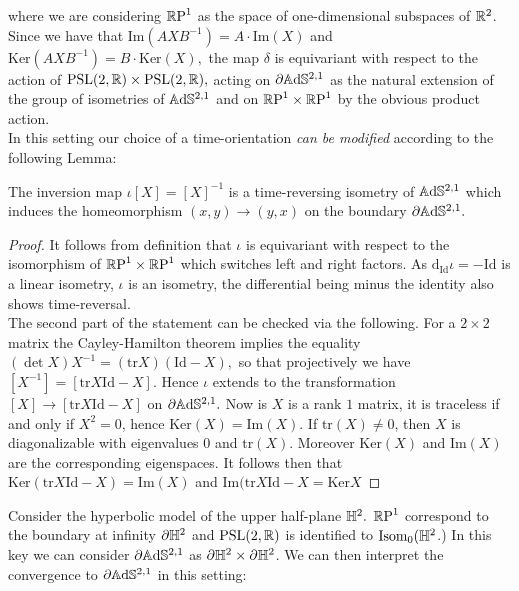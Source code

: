 where we are considering $\mathbb{R}\text{P}^1$ as the space of one-dimensional subspaces of $\mathbb{R}^2$. Since we have that $\text{Im}(AXB^{-1})=A\cdot\text{Im}(X)$ and $\text{Ker} (AXB^{-1})=B\cdot\text{Ker}(X),$ the map $\delta$ is equivariant with respect to the action of $\text{PSL}(2,\mathbb{R})\times\text{PSL}(2,\mathbb{R}),$ acting on $\partial\mathbb{A}\mathrm{d}\mathbb{S}^{2,1}$ as the natural extension of the group of isometries of $\mathbb{A}\mathrm{d}\mathbb{S}^{2,1}$ and on $\mathbb{R}\text{P}^1\times\mathbb{R}\text{P}^1$ by the obvious product action.\\
In this setting our choice of a time-orientation \textit{can be modified} according to the following Lemma:
\begin{lemma}\label{invertime}
    The inversion map $\iota[X]=[X]^{-1}$  is a time-reversing isometry of $\mathbb{A}\mathrm{d}\mathbb{S}^{2,1}$ which induces the homeomorphism $(x,y)\to(y,x)$ on the boundary $\partial\mathbb{A}\mathrm{d}\mathbb{S}^{2,1}.$
\end{lemma}
\begin{proof}
    It follows from definition that $\iota$ is equivariant with respect to the isomorphism of $\mathbb{R}\text{P}^1\times\mathbb{R}\text{P}^1$ which switches left and right factors. As $\text{d}_\text{Id}\iota=-\text{Id}$ is a linear isometry, $\iota$ is an isometry, the differential being minus the identity also shows time-reversal. \\
    The second part of the statement can be checked via the following. For a $2\times2$ matrix the Cayley-Hamilton theorem implies the equality $(\det X)X^{-1}=(\text{tr}X)(\text{Id}-X),$ so that projectively we have $[X^{-1}]=[\text{tr}X\text{Id}-X].$ Hence $\iota$ extends to the transformation $[X]\to[\text{tr}X\text{Id}-X]$ on $\partial\mathbb{A}\mathrm{d}\mathbb{S}^{2,1}.$ Now is $X$ is a rank $1$ matrix, it is traceless if and only if $X^2=0$, hence $\text{Ker}(X)=\text{Im}(X).$ If $\text{tr}(X)\neq 0$, then $X$ is diagonalizable with eigenvalues $0$ and $\text{tr}(X)$. Moreover $\text{Ker}(X)$ and $\text{Im}(X)$ are the corresponding eigenspaces. It follows then that $\text{Ker}(\text{tr}X\text{Id}-X)=\text{Im}(X)$ and $\text{Im}(\text{tr}X\text{Id}-X=\text{Ker}X$ 
\end{proof}


Consider the hyperbolic model of the upper half-plane $\mathbb{H}^2.$ $\mathbb{R}\text{P}^1$ correspond to the boundary at infinity $\partial\mathbb{H}^2$ and $\text{PSL}(2,\mathbb{R})$ is identified to $\text{Isom}_0(\mathbb{H}^2$.) In this key we can consider $\partial\mathbb{A}\mathrm{d}\mathbb{S}^{2,1}$ as $\partial\mathbb{H}^2\times\partial\mathbb{H}^2$. We can then interpret the convergence to $\partial\mathbb{A}\mathrm{d}\mathbb{S}^{2,1}$ in this setting:

